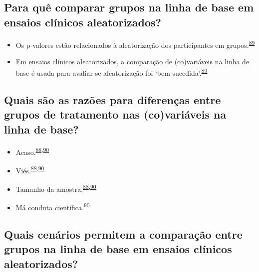 \documentclass[
]{book}
\begin{document}
\hypertarget{para-quuxea-comparar-grupos-na-linha-de-base-em-ensaios-cluxednicos-aleatorizados}{%
\subsection{Para quê comparar grupos na linha de base em ensaios clínicos aleatorizados?}\label{para-quuxea-comparar-grupos-na-linha-de-base-em-ensaios-cluxednicos-aleatorizados}}

\begin{itemize}
\item
  Os p-valores estão relacionados à aleatorização dos participantes em grupos.\textsuperscript{\protect\hyperlink{ref-Bolzern2019}{89}}
\item
  Em ensaios clínicos aleatorizados, a comparação de (co)variáveis na linha de base é usada para avaliar se aleatorização foi `bem sucedida'.\textsuperscript{\protect\hyperlink{ref-Bolzern2019}{89}}
\end{itemize}

\hypertarget{quais-suxe3o-as-razuxf5es-para-diferenuxe7as-entre-grupos-de-tratamento-nas-covariuxe1veis-na-linha-de-base}{%
\subsection{Quais são as razões para diferenças entre grupos de tratamento nas (co)variáveis na linha de base?}\label{quais-suxe3o-as-razuxf5es-para-diferenuxe7as-entre-grupos-de-tratamento-nas-covariuxe1veis-na-linha-de-base}}

\begin{itemize}
\item
  Acaso.\textsuperscript{\protect\hyperlink{ref-Stang2018}{88},\protect\hyperlink{ref-chen2020}{90}}
\item
  Viés.\textsuperscript{\protect\hyperlink{ref-Stang2018}{88},\protect\hyperlink{ref-chen2020}{90}}
\item
  Tamanho da amostra.\textsuperscript{\protect\hyperlink{ref-Stang2018}{88},\protect\hyperlink{ref-chen2020}{90}}
\item
  Má conduta científica.\textsuperscript{\protect\hyperlink{ref-chen2020}{90}}
\end{itemize}

\hypertarget{quais-cenuxe1rios-permitem-a-comparauxe7uxe3o-entre-grupos-na-linha-de-base-em-ensaios-cluxednicos-aleatorizados}{%
\subsection{Quais cenários permitem a comparação entre grupos na linha de base em ensaios clínicos aleatorizados?}\label{quais-cenuxe1rios-permitem-a-comparauxe7uxe3o-entre-grupos-na-linha-de-base-em-ensaios-cluxednicos-aleatorizados}}
\end{document}
